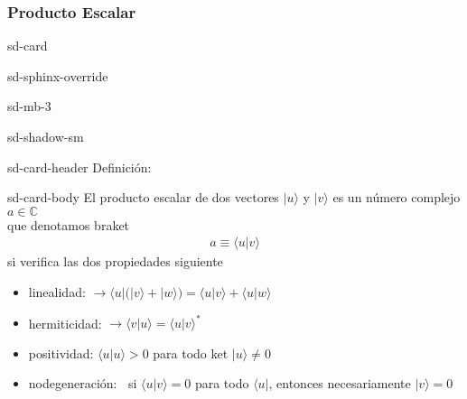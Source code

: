 \documentclass[letterpaper,10pt,english]{jupyterBook}
\newcommand{\bra}[1]{\langle #1|}
\newcommand{\ket}[1]{|#1\rangle}
\newcommand{\braket}[2]{\langle #1|#2\rangle}
\begin{document}
\subsubsection{Producto Escalar}
\label{\detokenize{docs/Part_01_Formalismo/Chapter_01_02_Formalismo_matem_xe1tico/01_02_Vectores_myst:producto-escalar}}
\begin{sphinxuseclass}{sd-card}
\begin{sphinxuseclass}{sd-sphinx-override}
\begin{sphinxuseclass}{sd-mb-3}
\begin{sphinxuseclass}{sd-shadow-sm}
\begin{sphinxuseclass}{sd-card-header}
\sphinxAtStartPar
Definición:

\end{sphinxuseclass}
\begin{sphinxuseclass}{sd-card-body}
\sphinxAtStartPar
El producto escalar de dos vectores \(\ket{u}\) y \(\ket{v}\) es un número complejo
\(a\in{\mathbb C}\)\\
que denotamos braket
\begin{equation*}
\begin{split}a \equiv \braket{u}{v} \end{split}
\end{equation*}
\sphinxAtStartPar
si verifica las dos propiedades siguiente
\begin{itemize}
\item {} 
\sphinxAtStartPar
linealidad: \(\to \bra{u}\big(\ket{v}+\ket{w}\big) = \braket{u}{v} + \braket{u}{w}\)

\item {} 
\sphinxAtStartPar
hermiticidad: \(\to \braket{v}{u} = \braket{u}{v}^*\)

\item {} 
\sphinxAtStartPar
positividad: \(\braket{u}{u} >0\) para todo ket \(\ket{u}\neq 0\)

\item {} 
\sphinxAtStartPar
no\sphinxhyphen{}degeneración: \(~\) si  \(\braket{u}{v} = 0\) para todo \(\bra{u}\), entonces necesariamente \(\ket{v}=0\)

\end{itemize}

\end{sphinxuseclass}
\end{sphinxuseclass}
\end{sphinxuseclass}
\end{sphinxuseclass}
\end{sphinxuseclass}
\end{document}

